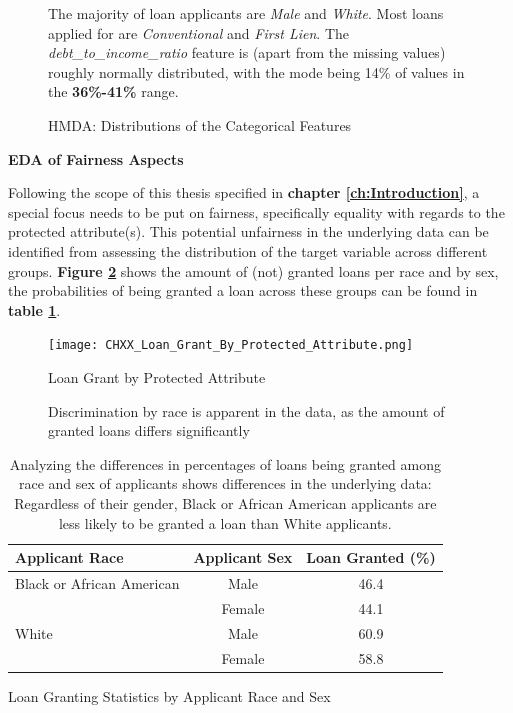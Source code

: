 \begin{figure}[!htbp]
    \caption{HMDA: Distributions of the Categorical Features}
    \label{fig:HMDA_Categorical_Features_Distributions}
    \medskip
    \small
    The majority of loan applicants are \textit{Male} and \textit{White}. Most loans applied for are \textit{Conventional} and \textit{First Lien}. The \textit{debt\_to\_income\_ratio} feature is (apart from the missing values) roughly normally distributed, with the mode being 14\% of values in the \textbf{36\%-41\%} range.

\end{figure}


\textbf{EDA of Fairness Aspects}

Following the scope of this thesis specified in \textbf{chapter \ref{ch:Introduction}}, a special focus needs to be put  on fairness, specifically equality with regards to the protected attribute(s).
This potential unfairness in the underlying data can be identified from assessing the distribution of the target variable across different groups.
\textbf{Figure \ref{fig:CHXX_Loan_Grant_By_Protected_Attribute}} shows the amount of (not) granted loans per race and by sex, the probabilities of being granted a loan across these groups can be found in \textbf{table \ref{tab:loan_granting}}.\@

\begin{figure}[!htbp]
    \centering
    \texttt{[image: CHXX\_Loan\_Grant\_By\_Protected\_Attribute.png]}
    \caption{Loan Grant by Protected Attribute}
    \caption*{Discrimination by race is apparent in the data, as the amount of granted loans differs significantly}
    \label{fig:CHXX_Loan_Grant_By_Protected_Attribute}
\end{figure}

\begin{table}[htbp]
    \centering
      \begin{tabular}{lcc}
      \toprule
      \textbf{Applicant Race} & \textbf{Applicant Sex} & \textbf{Loan Granted (\%)} \\
      \midrule
      Black or African American & Male    & 46.4 \\
            & Female  & 44.1 \\
      White & Male    & 60.9 \\
            & Female  & 58.8 \\
      \bottomrule
      \end{tabular}
      \caption{Loan Granting Statistics by Applicant Race and Sex}
      \caption*{Analyzing the differences in percentages of loans being granted among race and sex of applicants shows differences in the underlying data: Regardless of their gender, Black or African American applicants are less likely to be granted a loan than White applicants.}
    \label{tab:loan_granting}%
\end{table}%

